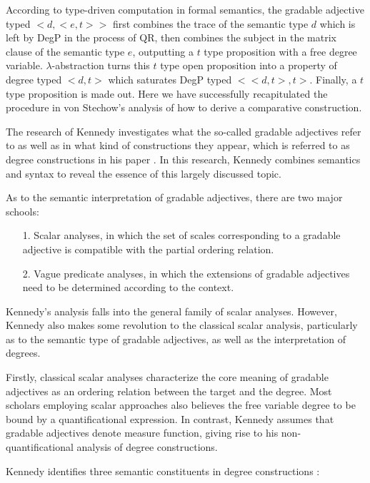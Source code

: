 \documentclass{ctexart}
\let \cite \parencite
\begin{document}
According to type-driven computation in formal semantics, the gradable adjective typed $<d,<e,t>>$ first combines the trace of the semantic type $d$ which is left by DegP in the process of QR, then combines the subject in the matrix clause of the semantic type $e$, outputting a $t$ type proposition with a free degree variable. $\lambda$-abstraction turns this $t$ type open proposition into a property of degree typed $<d,t>$ which saturates DegP typed $<<d,t>,t>$. Finally, a $t$ type proposition is made out. Here we have successfully recapitulated the procedure in von Stechow’s analysis of how to derive a comparative construction.

The research of Kennedy investigates what the so-called gradable adjectives refer to as well as in what kind of constructions they appear, which is referred to as degree constructions in his paper \cite{kennedy1997}. In this research, Kennedy combines semantics and syntax to reveal the essence of this largely discussed topic.

As to the semantic interpretation of gradable adjectives, there are two major schools:

\begin{itemize}
    \item[1.] Scalar analyses, in which the set of scales corresponding to a gradable adjective is compatible with the partial ordering relation\cite{cresswell1976,bierwisch1989}.
    \item[2.] Vague predicate analyses, in which the extensions of gradable adjectives need to be determined according to the context\cite{ginet1973,kamp2013,klein1980}. 
\end{itemize}

Kennedy’s analysis falls into the general family of scalar analyses. However, Kennedy also makes some revolution to the classical scalar analysis, particularly as to the semantic type of gradable adjectives, as well as the interpretation of degrees.

Firstly, classical scalar analyses characterize the core meaning of gradable adjectives as an ordering relation between the target and the degree. Most scholars employing scalar approaches also believes the free variable degree to be bound by a quantificational expression\cite{hellan1981,hoeksema1983,von1984a}. In contrast, Kennedy assumes that gradable adjectives denote measure function, giving rise to his non-quantificational analysis of degree constructions.

Kennedy identifies three semantic constituents in degree constructions \cite{russell1905}: 
\end{document}
